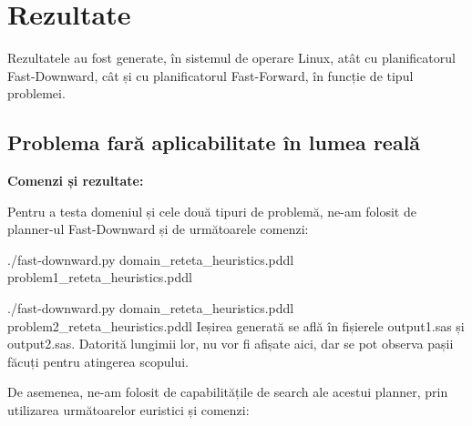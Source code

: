 \section{Rezultate}
 
Rezultatele au fost generate, în sistemul de operare Linux, atât cu planificatorul Fast-Downward, cât și cu planificatorul Fast-Forward, în funcție de tipul problemei.

 
 
 \subsection{Problema fară aplicabilitate în lumea reală}
 \textbf{Comenzi și rezultate:}
 
Pentru a testa domeniul și cele două tipuri de problemă, ne-am folosit de planner-ul Fast-Downward și de următoarele comenzi:
\bigskip

./fast-downward.py domain\_reteta\_heuristics.pddl problem1\_reteta\_heuristics.pddl 

./fast-downward.py domain\_reteta\_heuristics.pddl problem2\_reteta\_heuristics.pddl 
\bigskip
Ieșirea generată se află în fișierele output1.sas și output2.sas. Datorită lungimii lor, nu vor fi afișate aici, dar se pot observa pașii făcuți pentru atingerea scopului.
\bigskip

De asemenea, ne-am folosit de capabilitățile de search ale acestui planner, prin utilizarea următoarelor euristici și comenzi:

\newline

